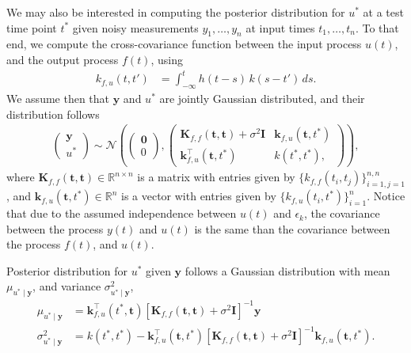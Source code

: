 \documentclass[journal]{IEEEtran}
\begin{document}
We may also be interested in computing the posterior distribution for $u^*$ at a test time point $t^*$ given noisy
measurements $y_1, \ldots, y_n$ at input times $t_1, \ldots, t_n$. To that end, we compute the cross-covariance function
between the input process $u(t)$, and the output process $f(t)$, using
\begin{align}
k_{f,u}(t,t') & = \int_{-\infty}^t h(t-s)\, k(s - t')\, ds.
\label{eq:fucov}
\end{align}
We assume then that $\mathbf{y}$ and $u^*$ are jointly Gaussian distributed, and their distribution follows
\begin{align*}
\begin{pmatrix}
\mathbf{y}\\
u^*
\end{pmatrix}\sim
\mathcal{N}
\left(
\begin{pmatrix}
\mathbf{0}\\
0
\end{pmatrix},
\begin{pmatrix}
\mathbf{K}_{f,f}(\mathbf{t}, \mathbf{t}) + \sigma^2\mathbf{I} & \mathbf{k}_{f,u}(\mathbf{t}, t^*)\\
\mathbf{k}_{f,u}^{\top}(\mathbf{t}, t^*) & k(t^*, t^*),
\end{pmatrix}
\right),
\end{align*}
where $\mathbf{K}_{f,f}(\mathbf{t}, \mathbf{t})\in\mathbb{R}^{n\times n}$ is a matrix with entries given by
$\{k_{f,f}(t_i, t_j)\}_{i=1, j=1}^{n,n}$, and $\mathbf{k}_{f,u}(\mathbf{t}, t^*) \in\mathbb{R}^{n}$ is a vector with entries
given by $\{k_{f,u}(t_i, t^*)\}_{i=1}^{n}$. Notice that due to the assumed independence between $u(t)$ and $\epsilon_k$,
the covariance between the process $y(t)$ and $u(t)$ is the same than the covariance between the process $f(t)$, and
$u(t)$.

Posterior distribution for $u^*$ given $\mathbf{y}$ follows a Gaussian distribution with mean $\mu_{u^* \mid \mathbf{y}}$, and
variance $\sigma^2_{u^* \mid \mathbf{y}}$,
\begin{align*}
\mu_{u^* \mid \mathbf{y}} & = \mathbf{k}_{f,u}^{\top}(t^*, \mathbf{t})\left[\mathbf{K}_{f,f}(\mathbf{t}, \mathbf{t})
+ \sigma^2\mathbf{I}\right]^{-1}\mathbf{y}\\
\sigma^2_{u^* \mid \mathbf{y}} & =  k(t^*, t^*) - \mathbf{k}_{f,u}^{\top}(\mathbf{t}, t^*)\left[\mathbf{K}_{f,f}(\mathbf{t}, \mathbf{t})
+ \sigma^2\mathbf{I}\right]^{-1}\mathbf{k}_{f,u}(\mathbf{t}, t^*).
\end{align*}
\end{document}
